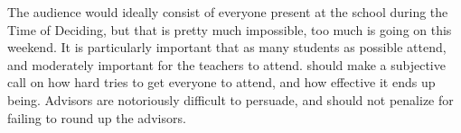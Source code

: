 \documentclass[green]{GL2020}
\begin{document}
The audience would ideally consist of everyone present at the school during the Time of Deciding, but that is pretty much impossible, too much is going on this weekend. It is particularly important that as many students as possible attend, and moderately important for the teachers to attend. \cPrincipal{} should make a subjective call on how hard \cMusic{} tries to get everyone to attend, and how effective it ends up being. Advisors are notoriously difficult to persuade, and \cPrincipal{} should not penalize \cMusic{} for failing to round up the advisors.
\end{document}
